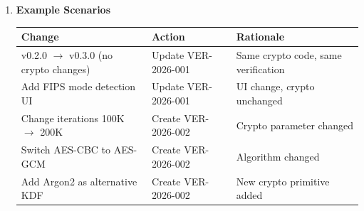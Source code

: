 \documentclass[11pt,letterpaper]{article}
\newcommand{\dmsection}[1]{\item \textbf{#1}\par}
\begin{document}
\begin{enumerate}
\begin{itemize}
    \item Extracts current version from \texttt{CHANGELOG.md}
    \item Retrieves current git commit hash and date
    \item Updates VER document title page and metadata using \texttt{sed}
    \item Compiles updated PDF to \texttt{.builds/test/}
\end{itemize}

\textbf{Updated Fields:}
\begin{itemize}
    \item Title page version (e.g., ``SendCUIEmail v0.3.0'')
    \item Document info table (Version Tested, Git Commit, Commit Date)
    \item Test verification section commit reference
    \item Conclusion version/commit reference
    \item Footer commit reference
\end{itemize}

\textbf{Manual Updates Required:}

When line numbers shift due to code changes, the following must be manually updated:
\begin{itemize}
    \item Code excerpt line number references in each requirement section
    \item This ensures the document accurately points to the verified code
\end{itemize}

\dmsection{Example Scenarios}

\begin{tabularx}{\textwidth}{|l|l|X|}
\hline
\textbf{Change} & \textbf{Action} & \textbf{Rationale} \\
\hline
v0.2.0 $\rightarrow$ v0.3.0 (no crypto changes) & Update VER-2026-001 & Same crypto code, same verification \\
\hline
Add FIPS mode detection UI & Update VER-2026-001 & UI change, crypto unchanged \\
\hline
Change iterations 100K $\rightarrow$ 200K & Create VER-2026-002 & Crypto parameter changed \\
\hline
Switch AES-CBC to AES-GCM & Create VER-2026-002 & Algorithm changed \\
\hline
Add Argon2 as alternative KDF & Create VER-2026-002 & New crypto primitive added \\
\hline
\end{tabularx}


\end{enumerate}
\end{document}
